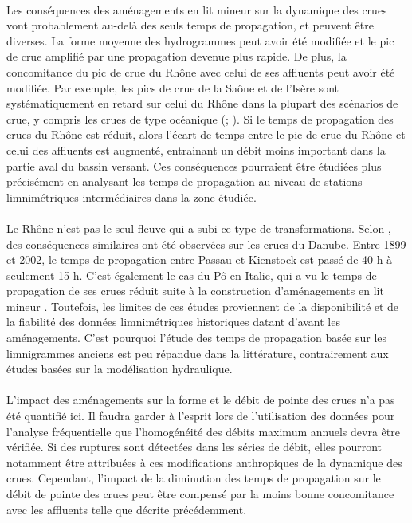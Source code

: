 	\paragraph{} Les conséquences des aménagements en lit mineur sur la dynamique des crues vont probablement au-delà des seuls temps de propagation, et peuvent être diverses. La forme moyenne des hydrogrammes peut avoir été modifiée et le pic de crue amplifié par une propagation devenue plus rapide. De plus, la concomitance du pic de crue du Rhône avec celui de ses affluents peut avoir été modifiée. Par exemple, les pics de crue de la Saône et de l'Isère sont systématiquement en retard sur celui du Rhône dans la plupart des scénarios de crue, y compris les crues de type océanique (\cite{parde_regime_1925}; \cite{rigaudiere_etude_2000}). Si le temps de propagation des crues du Rhône est réduit, alors l'écart de temps entre le pic de crue du Rhône et celui des affluents est augmenté, entrainant un débit moins important dans la partie aval du bassin versant. Ces conséquences pourraient être étudiées plus précisément en analysant les temps de propagation au niveau de stations limnimétriques intermédiaires dans la zone étudiée.

	\paragraph{} Le Rhône n'est pas le seul fleuve qui a subi ce type de transformations. Selon \citet{mitkova_analysis_2005}, des conséquences similaires ont été observées sur les crues du Danube. Entre 1899 et 2002, le temps de propagation entre Passau et Kienstock est passé de 40 h à seulement 15 h. C'est également le cas du Pô en Italie, qui a vu le temps de propagation de ses crues réduit suite à la construction d'aménagements en lit mineur \citep{di_baldassare_analysis_2009}. Toutefois, les limites de ces études proviennent de la disponibilité et de la fiabilité des données limnimétriques historiques datant d'avant les aménagements. C'est pourquoi l'étude des temps de propagation basée sur les limnigrammes anciens est peu répandue dans la littérature, contrairement aux études basées sur la modélisation hydraulique.
	
	\paragraph{} L'impact des aménagements sur la forme et le débit de pointe des crues n'a pas été quantifié ici. Il faudra garder à l'esprit lors de l'utilisation des données pour l'analyse fréquentielle que l'homogénéité des débits maximum annuels devra être vérifiée. Si des ruptures sont détectées dans les séries de débit, elles pourront notamment être attribuées à ces modifications anthropiques de la dynamique des crues. Cependant, l'impact de la diminution des temps de propagation sur le débit de pointe des crues peut être compensé par la moins bonne concomitance avec les affluents telle que décrite précédemment.

